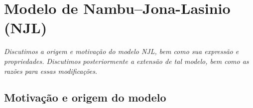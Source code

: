\chapter{Modelo de Nambu--Jona-Lasinio (NJL)}

\begin{fullwidth}\it
Discutimos a origem e motivação do modelo NJL, bem como sua expressão e propriedades. Discutimos posteriormente a extensão de tal modelo, bem como as razões para essas modificações.
\end{fullwidth}

\section{Motivação e origem do modelo}

